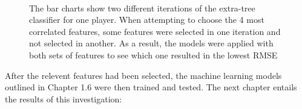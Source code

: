 \documentclass[a4paper,11pt,twoside]{article}
\begin{document}
\begin{figure} [h!]
 \captionsetup{justification=centering}
\\
\caption{The bar charts show two different iterations of the extra-tree classifier for one player. When attempting to choose the 4 most correlated features, some features were selected in one iteration and not selected in another. As a result, the models were applied with both sets of features to see which one resulted in the lowest RMSE}
\end{figure}

After the relevent features had been selected, the machine learning models outlined in Chapter 1.6 were then trained and tested. The next chapter entails the results of this investigation: 
\end{document}
